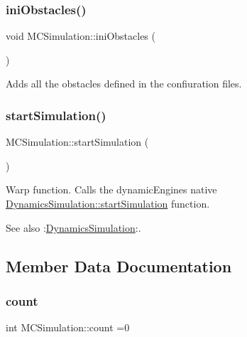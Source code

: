 \subsubsection{\texorpdfstring{ini\+Obstacles()}{iniObstacles()}}
{\footnotesize\ttfamily void M\+C\+Simulation\+::ini\+Obstacles (\begin{DoxyParamCaption}{ }\end{DoxyParamCaption})}

Adds all the obstacles defined in the confiuration files. \mbox{\label{class_m_c_simulation_aa305f18bd48dd26f916cc9c006a8dec8}} 
\subsubsection{\texorpdfstring{start\+Simulation()}{startSimulation()}}
{\footnotesize\ttfamily M\+C\+Simulation\+::start\+Simulation (\begin{DoxyParamCaption}{ }\end{DoxyParamCaption})}



Warp function. Calls the dynamic\+Engine\textquotesingle{}s native \hyperlink{class_dynamics_simulation_a00cf4a6cbde1ef708fdbd58e8d8a7727}{Dynamics\+Simulation\+::start\+Simulation} function. 

\begin{DoxySeeAlso}{See also}
\+:\hyperlink{class_dynamics_simulation}{Dynamics\+Simulation}\+:. 
\end{DoxySeeAlso}


\subsection{Member Data Documentation}
\mbox{\label{class_m_c_simulation_aa3853b6cec83b055593cbf58def0c164}} 
\subsubsection{\texorpdfstring{count}{count}}
{\footnotesize\ttfamily int M\+C\+Simulation\+::count =0\hspace{0.3cm}{\ttfamily [static]}}

